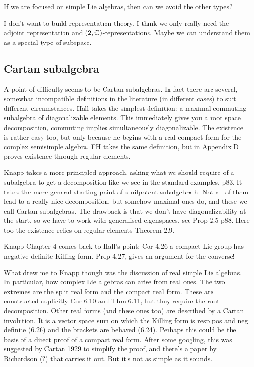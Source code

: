 \documentclass[twoside,11pt,a4paper,leqno]{article}
\numberwithin{equation}{section}
\theoremstyle{plain}
\theoremstyle{definition}
\newcommand{\bbC}{\mathbb{C}}
\begin{document}
If we are focused on simple Lie algebras, then can we avoid the other types?

I don't want to build representation theory.
I think we only really need the adjoint representation and $\sl(2,\bbC)$-representations.
Maybe we can understand them as a special type of subspace.


\subsection{Cartan subalgebra}
A point of difficulty seems to be Cartan subalgebras.
In fact there are several, somewhat incompatible definitions in the literature (in different cases) to suit different circumstances.
Hall takes the simplest definition: a maximal commuting subalgebra of diagonalizable elements.
This immediately gives you a root space decomposition, commuting implies simultaneously diagonalizable.
The existence is rather easy too, but only because he begins with a real compact form for the complex semisimple algebra.
FH takes the same definition, but in Appendix D proves existence through regular elements.

Knapp takes a more principled approach, asking what we should require of a subalgebra to get a decomposition like we see in the standard examples, p83.
It takes the more general starting point of a nilpotent subalgebra h.
Not all of them lead to a really nice decomposition, but somehow maximal ones do, and these we call Cartan subalgebras.
The drawback is that we don't have diagonalizability at the start, so we have to work with generalised eigenspaces, see Prop 2.5 p88.
Here too the existence relies on regular elements Theorem 2.9.

Knapp Chapter 4 comes back to Hall's point: Cor 4.26 a compact Lie group has negative definite Killing form. Prop 4.27, gives an argument for the converse!

What drew me to Knapp though was the discussion of real simple Lie algebras.
In particular, how complex Lie algebras can arise from real ones.
The two extremes are the split real form and the compact real form.
These are constructed explicitly Cor 6.10 and Thm 6.11, but they require the root decomposition.
Other real forms (and these ones too) are described by a Cartan involution. 
It is a vector space sum on which the Killing form is resp pos and neg definite (6.26) and the brackets are behaved (6.24).
Perhaps this could be the basis of a direct proof of a compact real form.
After some googling, this was suggested by Cartan 1929 to simplify the proof, and there's a paper by Richardson (?) that carries it out.
But it's not as simple as it sounds.
\end{document}
